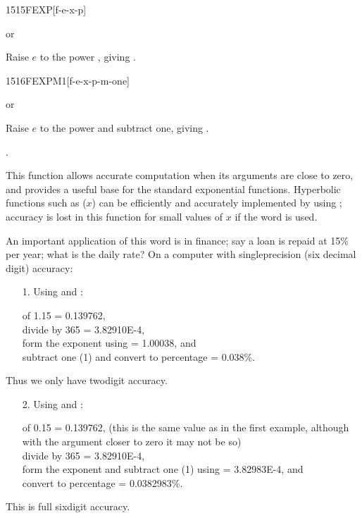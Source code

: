 \begin{worddef}{1515}{FEXP}[f-e-x-p]
\item {} or

	Raise $e$ to the power , giving .
\end{worddef}


\begin{worddef}{1516}{FEXPM1}[f-e-x-p-m-one]
\item {} or

	Raise $e$ to the power  and subtract one, giving .

\see {}.

	\begin{rationale} %
		This function allows accurate computation when its arguments
		are close to zero, and provides a useful base for the standard
		exponential functions. Hyperbolic functions such as
\textsf{($x$)} can be efficiently and accurately
		implemented by using ; accuracy is lost in this
		function for small values of $x$ if the word  is
		used.

		An important application of this word is in finance; say a loan
		is repaid at 15\% per year; what is the daily rate? On a computer
		with singleprecision (six decimal digit) accuracy:

		\begin{enumerate}
		\item[1.] Using  and :

			 of 1.15 = 0.139762, \\
			divide by 365 = 3.82910E-4, \\
			form the exponent using  = 1.00038, and \\
			subtract one (1) and convert to percentage = 0.038\%.
		\end{enumerate}
		Thus we only have twodigit accuracy.
		\begin{enumerate}
		\item[2.] Using  and :

			 of 0.15 = 0.139762, (this is the same value
			as in the first example, although with the argument closer
			to zero it may not be so) \\
			divide by 365 = 3.82910E-4, \\
			form the exponent and subtract one (1) using
			 = 3.82983E-4, and \\
			convert to percentage = 0.0382983\%.
		\end{enumerate}
		This is full sixdigit accuracy.


\end{rationale}
\end{worddef}
